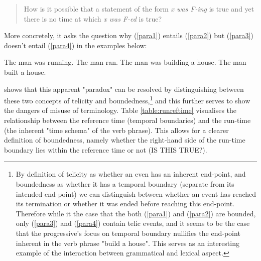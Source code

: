 \begin{quotation}
    How is it possible that a statement of the form \emph{x was F-ing} is true and yet there
    is no time at which \emph{x was F-ed} is true?
\end{quotation}
More concretely, it asks the question why (\ref{para1}) entails (\ref{para2}) but (\ref{para3}) doesn't entail (\ref{para4}) in the examples below:
\begin{exe}
    \ex The man was running.
    \label{para1}
    \ex The man ran.
    \label{para2}
    \ex The man was building a house.
    \label{para3}
    \ex The man built a house.
    \label{para4}
\end{exe}
\citet{6608d9d0-a477-39af-8491-2172df5ae612} shows that this apparent "paradox" can be resolved by distinguishing between these two concepts of telicity and boundedness,\footnote{By definition of telicity as whether an even has an inherent end-point, and boundedness as whether it has a temporal boundary (separate from its intended end-point) we can distinguish between whether an event has reached its termination or whether it was ended before reaching this end-point. Therefore while it the case that the both (\ref{para1}) and (\ref{para2}) are bounded, only (\ref{para3}) and (\ref{para4}) contain telic events, and it seems to be the case that the progressive's focus on temporal boundary nullifies the end-point inherent in the verb phrase "build a house". This serves as an interesting example of the interaction between grammatical and lexical aspect.} and this further serves to show the dangers of misuse of terminology. Table \ref{table:runreftime} visualises the relationship between the reference time (temporal boundaries) and the run-time (the inherent "time schema" of the verb phrase). This allows for a clearer definition of boundedness, namely whether the right-hand side of the run-time boundary lies within the reference time or not (IS THIS TRUE?).


